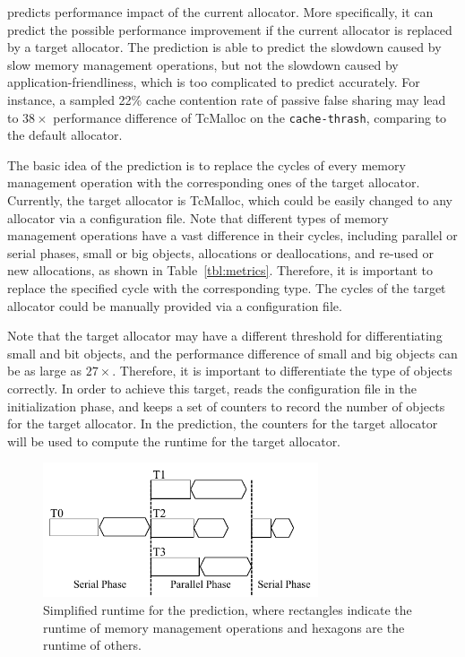 \label{sec:predict}

\MP{} predicts performance impact of the current allocator. More specifically, it can predict the possible performance improvement if the current allocator is replaced by a target allocator. The prediction is able to predict the slowdown caused by slow memory management operations, but not the slowdown caused by application-friendliness, which is too complicated to predict accurately. For instance, a sampled 22\% cache contention rate of passive false sharing may lead to $38\times$ performance difference of TcMalloc on the \texttt{cache-thrash}, comparing to the default allocator. 

The basic idea of the prediction is to replace the cycles of every memory management operation with the corresponding ones of the target allocator. Currently, the target allocator is TcMalloc, which could be easily changed to any allocator via a configuration file. Note that different types of memory management operations have a vast difference in their cycles, including parallel or serial phases, small or big objects, allocations or deallocations, and re-used or new allocations, as shown in Table~\ref{tbl:metrics}. Therefore, it is important to replace the specified cycle with the corresponding type. The cycles of the target allocator could be manually provided via a configuration file. 

Note that the target allocator may have a different threshold for differentiating small and bit objects, and the performance difference of small and big objects can be as large as $27\times$. Therefore, it is important to differentiate the type of objects correctly. In order to achieve this target, \MP{} reads the configuration file in the initialization phase, and keeps a set of counters to record the number of objects for the target allocator. In the prediction, the counters for the target allocator will be used to compute the runtime for the target allocator. 

 



\begin{figure}[!ht]
\centering
\includegraphics[width=3.2in]{figures/forkjoin}
\caption{Simplified runtime for the prediction, where rectangles indicate the runtime of memory management operations and hexagons are the runtime of others. \label{fig:time}}
\end{figure}

